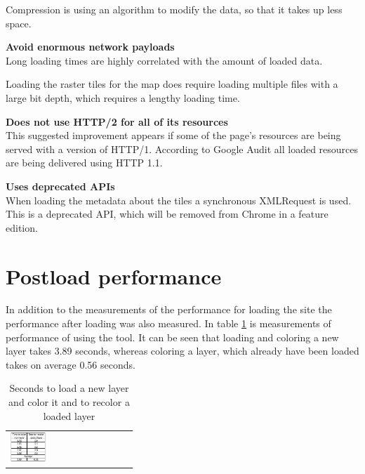 Compression is using an algorithm to modify the data, so that it takes up less space.
\citep{MinifyJS}

\textbf{Avoid enormous network payloads}\\
Long loading times are highly correlated with the amount of loaded data.  
\citep{LoadingTooMuch}

Loading the raster tiles for the map does require loading multiple files with a large bit depth, which requires a lengthy loading time. 

\textbf{Does not use HTTP/2 for all of its resources}\\
This suggested improvement appears if some of the page’s resources are being served with a version of HTTP/1. According to Google Audit all loaded resources are being delivered using HTTP 1.1.


\citep{HTTP2}

\textbf{Uses deprecated APIs}\\
When loading the metadata about the tiles a synchronous XMLRequest is used. This is a deprecated API, which will be removed from Chrome in a feature edition. 
\citep{OldApis}
\section{Postload performance}

In addition to the measurements of the performance for loading the site the performance after loading was also measured. In table \ref{tabPostloadPerformance} is measurements of performance of using the tool. It can be seen that loading and coloring a new layer takes 3.89 seconds, whereas coloring a layer, which already have been loaded takes on average 0.56 seconds. 

\begin{table}[htbp]
	\centering
	\begin{tabular}{l}
		\includegraphics[width=0.3\textwidth]{Pictures/tabPostloadPerformance}
	\end{tabular}
	\caption{Seconds to load a new layer and color it and to recolor a loaded layer}
	\label{tabPostloadPerformance}
\end{table}